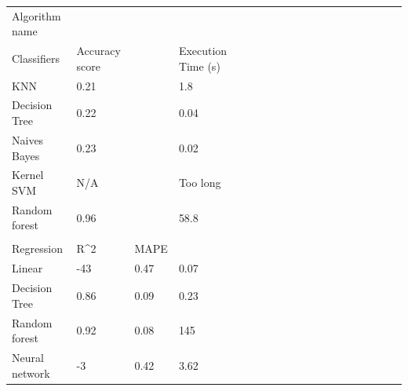 \documentclass[11pt,landscape]{article}
\begin{document}
\begin{table}
    \centering
    \begin{tabular}{lllllllllllllllllll}
    Algorithm name &                &      &                    &  &  &  &  &  &  &  &  &  &  &  &  &  &  &   \\
    Classifiers    & Accuracy score &      & Execution Time (s) &  &  &  &  &  &  &  &  &  &  &  &  &  &  &   \\
    KNN            & 0.21           &      & 1.8                &  &  &  &  &  &  &  &  &  &  &  &  &  &  &   \\
    Decision Tree  & 0.22           &      & 0.04               &  &  &  &  &  &  &  &  &  &  &  &  &  &  &   \\
    Naives Bayes   & 0.23           &      & 0.02               &  &  &  &  &  &  &  &  &  &  &  &  &  &  &   \\
    Kernel SVM     & N/A            &      & Too long           &  &  &  &  &  &  &  &  &  &  &  &  &  &  &   \\
    Random forest  & 0.96           &      & 58.8               &  &  &  &  &  &  &  &  &  &  &  &  &  &  &   \\
                   &                &      &                    &  &  &  &  &  &  &  &  &  &  &  &  &  &  &   \\
    Regression     & R\^{}2         & MAPE &                    &  &  &  &  &  &  &  &  &  &  &  &  &  &  &   \\
    Linear         & -43            & 0.47 & 0.07               &  &  &  &  &  &  &  &  &  &  &  &  &  &  &   \\
    Decision Tree  & 0.86           & 0.09 & 0.23               &  &  &  &  &  &  &  &  &  &  &  &  &  &  &   \\
    Random forest  & 0.92           & 0.08 & 145                &  &  &  &  &  &  &  &  &  &  &  &  &  &  &   \\
    Neural network & -3             & 0.42 & 3.62               &  &  &  &  &  &  &  &  &  &  &  &  &  &  &  
    \end{tabular}
    \label{tab:guillermo_t2}
\end{table}
    
\end{document}
